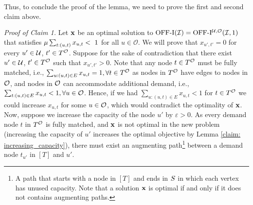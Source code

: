 {{Thus, to conclude the proof of the lemma, we need to prove the first and second claim above.}


 \noindent\textit{Proof of Claim 1.} Let $\mathbf{x}$ be {an} %
 optimal solution to $\mathrm{\mathrm{OFF}}\textrm{-}\mathrm{I}(\mathcal I) = \mathrm{\mathrm{OFF}}\textrm{-}\mathrm{I}^{\mathcal U, \mathcal O}(\mathcal I, 1)$ that satisfies { $\mu \sum_{t: (u,t)} x_{u,t} <~1$ for all $u \in \mathcal O$}. %
 {We will prove that $x_{u',t'} =0$ for every $u' \in \mathcal U$, $t' \in T^\mathcal O$. Suppose for the sake of contradiction that there exist $u' \in \mathcal U$, $t' \in T^\mathcal O$ such that $x_{u',t'}>0$.} 
 {Note that any node $t \in T^\mathcal O$ must be fully matched, i.e., 
 $\sum_{u:(u,t) \in E}x_{u,t}=1, \forall t \in T^\mathcal O$ as nodes in $T^\mathcal O$ have edges to nodes in $\mathcal O$, and nodes in $\mathcal O$ can accommodate additional demand, i.e., $\sum_{t:(u,t) \in E}x_{u,t} <1,  \forall u \in \mathcal O$. Hence, if we had $\sum_{u:(u,t) \in E}x_{u,t}<1$ for $t\in T^\mathcal O$ we could increase $x_{u,t}$ for some $u\in\mathcal O$, which would contradict the optimality of $\mathbf{x}$.}  
 {Now, suppose we increase the capacity of the node $u'$ by $\varepsilon>0$. As every demand node $t$ in $T^\mathcal O$ is fully matched, and $\mathbf{x}$ is not optimal in the new problem (increasing the capacity of $u'$ increases the optimal objective by Lemma \ref{claim: increasing_capacity})}, there must exist an augmenting path\footnote{A path that starts with a node in $[T]$ and ends in $S$ in which each vertex has unused capacity. Note that a solution $\mathbf{x}$ is optimal if and only if it does not contains augmenting paths.} between a demand node $t_{u'}$ in $[T]$ and $u'$. 
 
}
